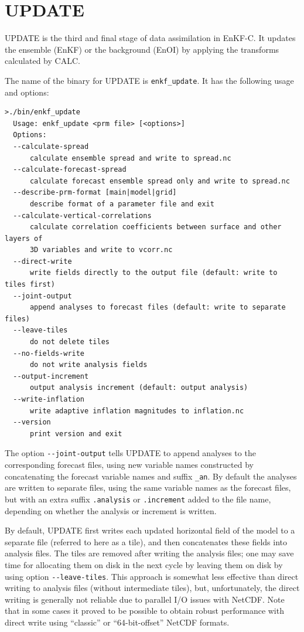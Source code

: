 \documentclass[11pt]{report}
\begin{document}
\section{UPDATE}

UPDATE is the third and final stage of data assimilation in EnKF-C.
It updates the ensemble (EnKF) or the background (EnOI) by applying the transforms calculated by CALC.

The name of the binary for UPDATE is \verb|enkf_update|.
It has the following usage and options:
\begin{Verbatim}[frame=single,fontsize=\footnotesize]
>./bin/enkf_update
  Usage: enkf_update <prm file> [<options>]
  Options:
  --calculate-spread
      calculate ensemble spread and write to spread.nc
  --calculate-forecast-spread
      calculate forecast ensemble spread only and write to spread.nc
  --describe-prm-format [main|model|grid]
      describe format of a parameter file and exit
  --calculate-vertical-correlations
      calculate correlation coefficients between surface and other layers of
      3D variables and write to vcorr.nc
  --direct-write
      write fields directly to the output file (default: write to tiles first)
  --joint-output
      append analyses to forecast files (default: write to separate files)
  --leave-tiles
      do not delete tiles
  --no-fields-write
      do not write analysis fields
  --output-increment
      output analysis increment (default: output analysis)
  --write-inflation
      write adaptive inflation magnitudes to inflation.nc
  --version
      print version and exit
\end{Verbatim}

The option \verb|--joint-output| tells UPDATE to append analyses to the corresponding forecast files, using new variable names constructed by concatenating the forecast variable names and suffix \verb|_an|.
By default the analyses are written to separate files, using the same variable names as the forecast files, but with an extra suffix \verb|.analysis| or \verb|.increment| added to the file name, depending on whether the analysis or increment is written.

By default, UPDATE first writes each updated horizontal field of the model to a separate file (referred to here as a tile), and then concatenates these fields into analysis files.
The tiles are removed after writing the analysis files; one may save time for allocating them on disk in the next cycle by leaving them on disk by using option \verb|--leave-tiles|.
This approach is somewhat less effective than direct writing to analysis files (without intermediate tiles), but, unfortunately, the direct writing is generally not reliable due to parallel I/O issues with NetCDF.
Note that in some cases it proved to be possible to obtain robust performance with direct write using ``classic'' or ``64-bit-offset'' NetCDF formats.
\end{document}
